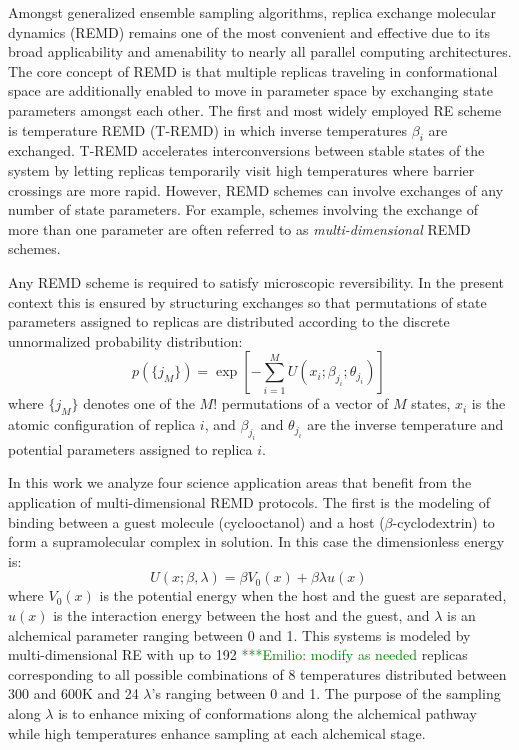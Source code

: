 \documentclass{sig-alternate}
\newcommand{\egnote}[1]{ {\textcolor{green} { ***Emilio: #1 }}}
\begin{document}
Amongst generalized ensemble sampling algorithms, replica exchange molecular
dynamics (REMD) remains one of the most convenient and effective due to its 
broad applicability and amenability to nearly all parallel computing 
architectures. The core concept of REMD is that multiple replicas traveling in
conformational space are additionally enabled to move in parameter space by 
exchanging state parameters amongst each other. The first and most widely 
employed RE scheme is temperature REMD (T-REMD) in which inverse temperatures 
$\beta_i$ are exchanged. T-REMD accelerates interconversions between stable 
states of the system by letting replicas temporarily visit high temperatures 
where barrier crossings are more rapid. However, REMD schemes can involve 
exchanges of any number of state parameters. For example, schemes involving the
exchange of more than one parameter are often referred to as 
\emph{multi-dimensional} REMD schemes.\cite{Mitsutake2010}

Any REMD scheme is required to satisfy microscopic reversibility. In the 
present context this is ensured by structuring exchanges so that permutations 
of state parameters assigned to replicas are distributed according to the 
discrete unnormalized probability distribution:\cite{chodera2011replica}
\begin{equation}
p(\{j_M\})=\exp\left[-\sum_{i=1}^M U(x_i;\beta_{j_i};\theta_{j_i})\right] \,
\end{equation}
where $\{j_M\}$ denotes one of the $M!$ permutations of a vector of $M$ states,
$x_i$ is the atomic configuration of replica $i$, and $\beta_{j_i}$ and 
$\theta_{j_i}$ are the inverse temperature and potential parameters assigned to
replica $i$.

In this work we analyze four science application areas that benefit from the 
application of multi-dimensional REMD protocols. The first is the modeling of 
binding between a guest molecule (cyclooctanol) and a host 
($\beta$-cyclodextrin) to form a supramolecular complex in solution.\cite{Gallicchio2012a} In this case the dimensionless energy is:\cite{Gallicchio2010}
\begin{equation}
U(x;\beta,\lambda) = \beta V_0(x) + \beta \lambda u(x) \,
\end{equation}
where $V_0(x)$ is the potential energy when the host and the guest are 
separated, $u(x)$ is the interaction energy between the host and the guest, and
$\lambda$ is an alchemical parameter ranging between 0 and 1. This systems is 
modeled by multi-dimensional RE with up to 192 \egnote{modify as needed} 
replicas corresponding to all possible combinations of 8 temperatures 
distributed between 300 and 600K and 24 $\lambda$'s ranging between 0 and 1. 
The purpose of the sampling along $\lambda$ is to enhance mixing of 
conformations along the alchemical pathway while high temperatures enhance 
sampling at each alchemical stage.
\end{document}
